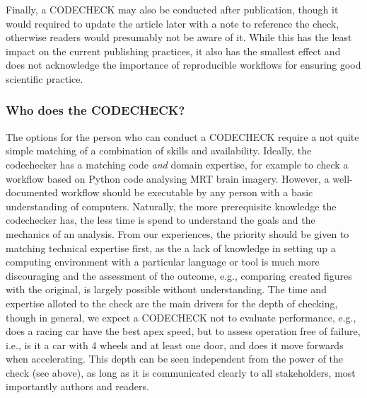 \documentclass[12pt]{article}
\begin{document}
Finally, a CODECHECK may also be conducted after publication, though it
would required to update the article later with a note to reference the check,
otherwise readers would presumably not be aware of it. While this has the
least impact on the current publishing practices, it also has the smallest
effect and does not acknowledge the importance of reproducible workflows for
ensuring good scientific practice.

\subsubsection*{Who does the CODECHECK?}\label{who-does-the-codecheck}

The options for the person who can conduct a CODECHECK require a not quite
simple matching of a combination of skills and availability. Ideally, the
codechecker has a matching code \emph{and} domain expertise, for example to
check a workflow based on Python code analysing MRT brain imagery. However,
a well-documented workflow should be executable by any person with a basic
understanding of computers. Naturally, the more prerequisite knowledge the
codechecker has, the less time is spend to understand the goals and 
the mechanics of an analysis. From our experiences, the priority should be
given to matching technical expertise first, as the a lack of knowledge in
setting  up a computing environment with a particular language or tool is 
much more discouraging and the assessment of the outcome, e.g., comparing
created figures with the original, is largely possible without 
understanding.
The time and expertise alloted to the check
are the main drivers for the depth of checking, though in general, we 
expect a CODECHECK not to evaluate performance, e.g., does a racing car
have the best apex speed, but to assess operation free of failure, i.e., 
is it a car with 4 wheels and at least one door, and does it move forwards
when accelerating. This depth can be seen independent from the power of
the check (see above), as long as it is communicated clearly to all
stakeholders, most importantly authors and readers.
\end{document}
